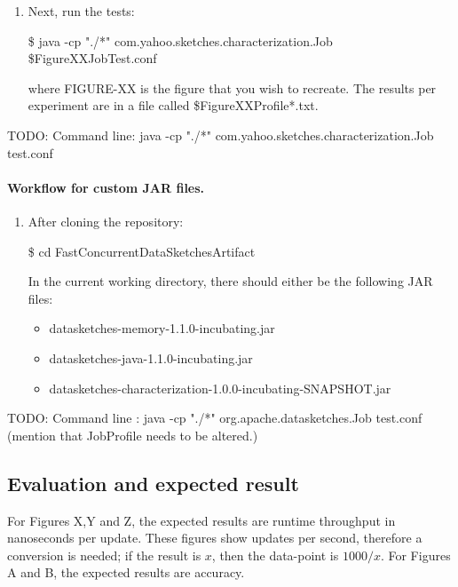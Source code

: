 \documentclass{sigplanconf}
\begin{document}
{\begin{enumerate}
  \item Next, run the tests:

  \hrulefill

  \$ java -cp "./*" com.yahoo.sketches.characterization.Job \${FigureXX}JobTest.conf

  \hrulefill

  \noindent where FIGURE-XX is the figure that you wish to recreate. The results per
  experiment are in a file called \${FigureXX}Profile*.txt.   

\end{enumerate}

TODO:
Command line:
java -cp "./*" com.yahoo.sketches.characterization.Job test.conf


\paragraph{\textbf{Workflow for custom JAR files.}}

\begin{enumerate}
  \item After cloning the repository:

  \hrulefill

  \$ cd FastConcurrentDataSketchesArtifact

  \hrulefill

  \noindent In the current working directory, there should either be the following JAR files:

  \begin{itemize}
    \item datasketches-memory-1.1.0-incubating.jar
    \item datasketches-java-1.1.0-incubating.jar
    \item datasketches-characterization-1.0.0-incubating-SNAPSHOT.jar
  \end{itemize}

\end{enumerate}

TODO:
Command line :
java -cp "./*" org.apache.datasketches.Job test.conf
(mention that JobProfile needs to be altered.)


\subsection{Evaluation and expected result}

For Figures X,Y and Z, the expected results are runtime throughput in nanoseconds
per update. These figures show updates per second, therefore a conversion is needed;
if the result is $x$, then the data-point is $1000/x$. For Figures A and B, the
expected results are accuracy.

}
\end{document}
